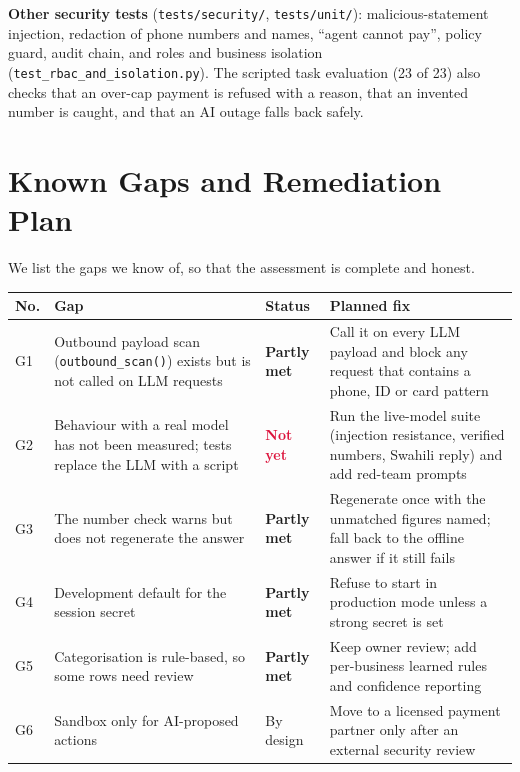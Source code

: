 \documentclass[10pt,a4paper]{article}
\newcommand{\code}[1]{\texttt{\small #1}}
\newcommand{\partly}{\textcolor{amber}{\textbf{Partly met}}}
\newcommand{\notyet}{\textcolor{crimson}{\textbf{Not yet}}}
\begin{document}
\textbf{Other security tests} (\code{tests/security/}, \code{tests/unit/}): malicious-statement injection, redaction of phone numbers and names, ``agent cannot pay'', policy guard, audit chain, and roles and business isolation (\code{test\_rbac\_and\_isolation.py}). The scripted task evaluation (23 of 23) also checks that an over-cap payment is refused with a reason, that an invented number is caught, and that an AI outage falls back safely.

\section{Known Gaps and Remediation Plan}
\label{sec:gaps}

We list the gaps we know of, so that the assessment is complete and honest.

\begin{center}
\begin{tabularx}{\textwidth}{@{}p{0.6cm}L{4.2cm}p{1.7cm}Y@{}}
\toprule
\textbf{No.} & \textbf{Gap} & \textbf{Status} & \textbf{Planned fix}\\
\midrule
G1 & Outbound payload scan (\code{outbound\_scan()}) exists but is not called on LLM requests & \partly & Call it on every LLM payload and block any request that contains a phone, ID or card pattern\\
G2 & Behaviour with a real model has not been measured; tests replace the LLM with a script & \notyet & Run the live-model suite (injection resistance, verified numbers, Swahili reply) and add red-team prompts\\
G3 & The number check warns but does not regenerate the answer & \partly & Regenerate once with the unmatched figures named; fall back to the offline answer if it still fails\\
G4 & Development default for the session secret & \partly & Refuse to start in production mode unless a strong secret is set\\
G5 & Categorisation is rule-based, so some rows need review & \partly & Keep owner review; add per-business learned rules and confidence reporting\\
G6 & Sandbox only for AI-proposed actions & By design & Move to a licensed payment partner only after an external security review\\
\bottomrule
\end{tabularx}
\end{center}
\end{document}

